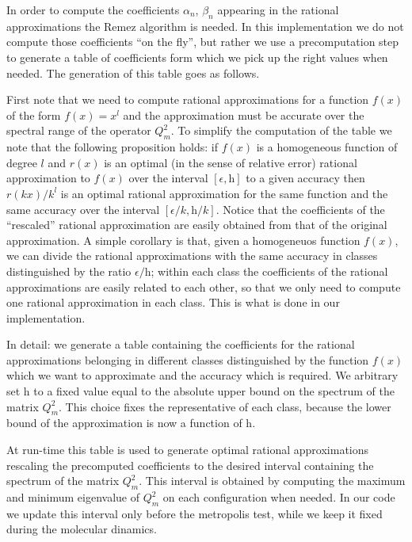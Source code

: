 \documentclass{article}[12pt]
\begin{document}
In order to compute the coefficients $\alpha_n$, $\beta_n$ appearing in the rational approximations
the Remez algorithm is needed. In this implementation we do not compute those coefficients ``on the fly'', but rather
we use a precomputation step to generate a table of coefficients form which we pick up the right values when needed.
The generation of this table goes as follows.

First note that we need to compute rational approximations for a function $f(x)$ of the form $f(x)=x^l$ and the approximation
must be accurate over the spectral range of the operator $Q_m^2$.
To simplify the computation of the table we note that the following proposition holds:
if $f(x)$ is a homogeneous function of degree $l$ and $r(x)$ is an optimal (in the sense of relative error)
rational approximation to $f(x)$ over the interval $[\epsilon,\mathrm{h}]$ to a given accuracy
then $r(kx)/k^l$ is an optimal rational approximation for the same function and the same accuracy
over the interval $[\epsilon/k,\mathrm{h}/k]$. Notice that the coefficients of the ``rescaled'' rational
approximation are easily obtained from that of the original approximation.
A simple corollary is that, given a homogeneuos function $f(x)$, we can divide the rational approximations
with the same accuracy in classes distinguished by the ratio $\epsilon/\mathrm{h}$; within each class
the coefficients of the rational approximations are easily related to each other, so that we only need
to compute one rational approximation in each class. This is what is done in our implementation.

In detail: we generate a table containing the coefficients for the rational approximations
 belonging in different classes distinguished by the function $f(x)$ which we want to approximate and
 the accuracy which is required. We arbitrary set $\mathrm{h}$ to a fixed value equal to the absolute
 upper bound on the spectrum of the matrix $Q_m^2$. This choice fixes the representative of each class,
because the lower bound of the approximation is now a function of $\mathrm{h}$.

At run-time this table is used to generate optimal rational approximations rescaling the
precomputed coefficients to the desired interval containing the spectrum of the matrix $Q_m^2$.
This interval is obtained by computing the maximum and minimum eigenvalue of $Q_m^2$ on
each configuration when needed. In our code we update this interval only before the
metropolis test, while we keep it fixed during the molecular dinamics.
\end{document}
